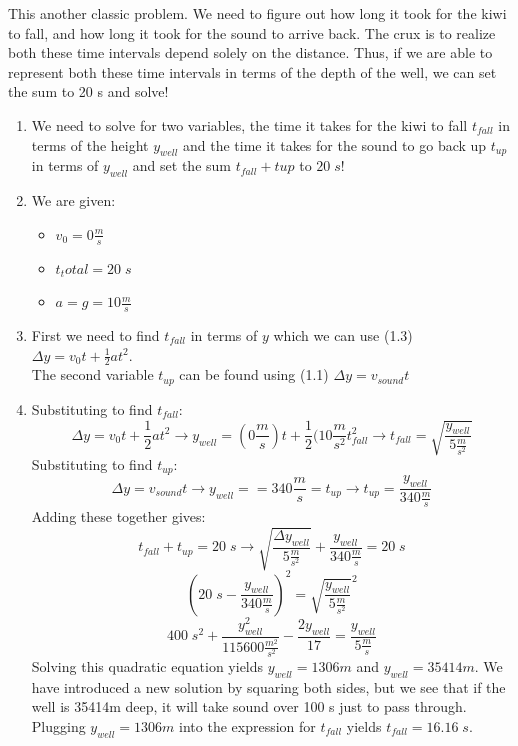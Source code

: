 \begin{solution}
This another classic problem. We need to figure out how long it took for the kiwi to fall, and how long it took for the sound to arrive back. The crux is to realize both these time intervals depend solely on the distance. Thus, if we are able to represent both these time intervals in terms of the depth of the well, we can set the sum to 20 s and solve!
\begin{enumerate}
    \item We need to solve for two variables, the time it takes for the kiwi to fall $t_{fall}$ in terms of the height $y_{well}$ and the time it takes for the sound to go back up $t_{up}$ in terms of $y_{well}$ and set the sum $t_{fall}+t{up}$ to $20\;s$!
    \item We are given:
    \begin{itemize}
        \item $v_0=0\frac{m}{s}$
        \item $t_total = 20\;s$
        \item $a = g = 10\frac{m}{s}$
    \end{itemize}
    \item First we need to find $t_{fall}$ in terms of $y$ which we can use (1.3) $\Delta y = v_0t + \frac{1}{2}at^2$. \\ The second variable $t_{up}$ can be found using (1.1) $\Delta y = v_{sound}t$
    \item Substituting to find $t_{fall}$:
    \begin{equation*}
        \Delta y = v_0t + \frac{1}{2}at^2 \rightarrow
        y_{well} = (0\frac{m}{s})t+\frac{1}{2}(10\frac{m}{s^2}t_{fall}^2 \rightarrow
        t_{fall} = \sqrt{\frac{y_{well}}{5\frac{m}{s^2}}}
    \end{equation*}
    Substituting to find $t_{up}$:
    \begin{equation*}
        \Delta y = v_{sound}t \rightarrow
        y_{well} = =340\frac{m}{s}=t_{up} \rightarrow
        t_{up} = \frac{y_{well}}{340\frac{m}{s}}
    \end{equation*}
    Adding these together gives:
    \begin{equation*}
        t_{fall}+t_{up}=20\;s \rightarrow
        \sqrt{\frac{\Delta y_{well}}{5\frac{m}{s^2}}} + \frac{y_{well}}{340\frac{m}{s}} = 20\;s
    \end{equation*}
    \begin{equation*}
        (20\;s-\frac{y_{well}}{340\frac{m}{s}})^2=
        \sqrt{\frac{y_{well}}{5\frac{m}{s^2}}}^2
    \end{equation*}
    \begin{equation*}
        400\;s^2+\frac{y_{well}^2}{115600\frac{m^2}{s^2}}-\frac{2y_{well}}{17}=
       \frac{y_{well}}{5\frac{m}{s}}
    \end{equation*}
    Solving this quadratic equation yields $y_{well}=1306m$ and $y_{well}=35414m$. We have introduced a new solution by squaring both sides, but we see that if the well is 35414m deep, it will take sound over 100 s just to pass through. Plugging $y_{well}=1306m$ into the expression for $t_{fall}$ yields $t_{fall}=16.16\;s$.
\end{enumerate}
\end{solution}

